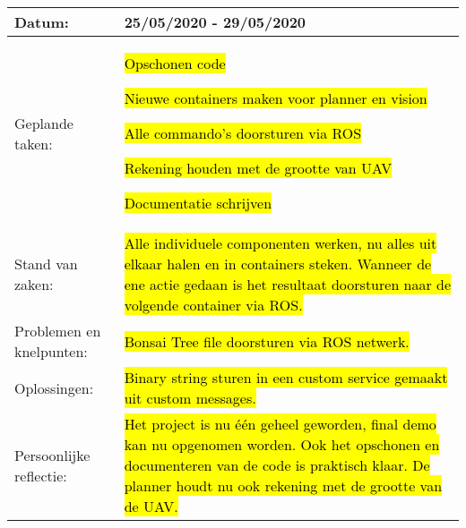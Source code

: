 \begin{tabularx}{\textwidth}{| l | X |}
  \hline
  Datum: & 25/05/2020 - 29/05/2020\\
  \hline
  Geplande taken: &
  \begin{compactitem}
    \item \hl{Opschonen code}
    \item \hl{Nieuwe containers maken voor planner en vision}
    \item \hl{Alle commando's doorsturen via ROS}
    \item \hl{Rekening houden met de grootte van UAV}
    \item \hl{Documentatie schrijven}
  \end{compactitem}\\
  \hline
  Stand van zaken: & \hl{Alle individuele componenten werken, nu alles uit elkaar halen en in containers steken. Wanneer de ene actie gedaan is het resultaat doorsturen naar de volgende container via ROS.}\\
  \hline
  Problemen en knelpunten: & \hl{Bonsai Tree file doorsturen via ROS netwerk.}\\
  \hline
  Oplossingen: & \hl{Binary string sturen in een custom service gemaakt uit custom messages.}\\
  \hline
  Persoonlijke reflectie: & \hl{Het project is nu \'e\'en geheel geworden, final demo kan nu opgenomen worden. Ook het opschonen en documenteren van de code is praktisch klaar. De planner houdt nu ook rekening met de grootte van de UAV.}\\
  \hline
\end{tabularx}